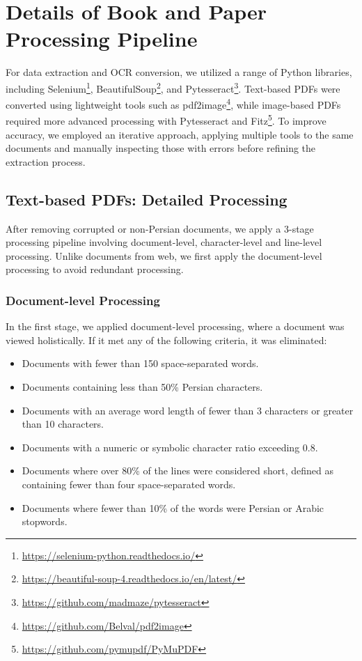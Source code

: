 \section{Details of Book and Paper Processing Pipeline}
For data extraction and OCR conversion, we utilized a range of Python libraries, including Selenium\footnote{\url{https://selenium-python.readthedocs.io/}}, BeautifulSoup\footnote{\url{https://beautiful-soup-4.readthedocs.io/en/latest/}}, and Pytesseract\footnote{\url{https://github.com/madmaze/pytesseract}}. Text-based PDFs were converted using lightweight tools such as pdf2image\footnote{\url{https://github.com/Belval/pdf2image}}, while image-based PDFs required more advanced processing with Pytesseract and Fitz\footnote{\url{https://github.com/pymupdf/PyMuPDF}}. To improve accuracy, we employed an iterative approach, applying multiple tools to the same documents and manually inspecting those with errors before refining the extraction process.

\label{sec:appendixB}
\subsection{Text-based PDFs: Detailed Processing}
After removing corrupted or non-Persian documents, we apply a 3-stage processing pipeline involving document-level, character-level and line-level processing. Unlike documents from web, we first apply the document-level processing to avoid redundant processing. 

\subsubsection{Document-level Processing}
In the first stage, we applied document-level processing, where a document was viewed holistically. If it met any of the following criteria, it was eliminated: 
\begin{itemize} 
    \item Documents with fewer than 150 space-separated words. 
    \item Documents containing less than 50\% Persian characters. 
    \item Documents with an average word length of fewer than 3 characters or greater than 10 characters. 
    \item Documents with a numeric or symbolic character ratio exceeding 0.8. 
    \item Documents where over 80\% of the lines were considered short, defined as containing fewer than four space-separated words. 
    \item Documents where fewer than 10\% of the words were Persian or Arabic stopwords. 
\end{itemize}

